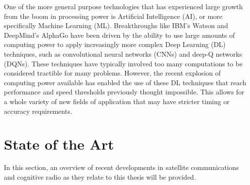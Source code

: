 \par One of the more general purpose technologies that has experienced large growth from the boom in processing power is Artificial Intelligence (AI), or more specifically Machine Learning (ML). Breakthroughs like IBM's Watson \cite{watsonPaper} and DeepMind's AlphaGo\cite{paulo5} have been driven by the ability to use large amounts of computing power to apply increasingly more complex Deep Learning (DL) techniques, such as convolutional neural networks (CNNs) and deep-Q networks (DQNs)\cite{paulo5}. These techniques have typically involved too many computations to be considered tractible for many problems. However, the recent explosion of computing power available has enabled the use of these DL techniques that reach performance and speed thresholds previously thought impossible. This allows for a whole variety of new fields of application that may have stricter timing or accuracy requirements. 


\section{State of the Art}
\par In this section, an overview of recent developments in satellite communications and cognitive radio as they relate to this thesis will be provided. 
